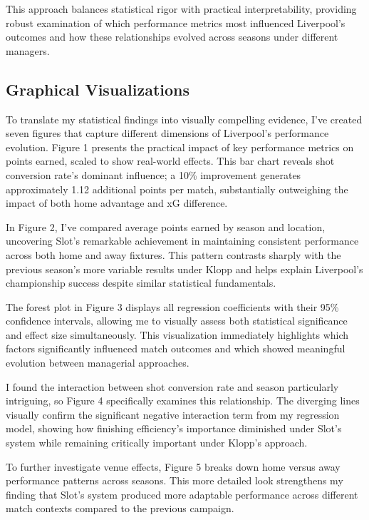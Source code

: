 \documentclass[12pt]{article}
\begin{document}
This approach balances statistical rigor with practical interpretability, providing robust examination of which performance metrics most influenced Liverpool's outcomes and how these relationships evolved across seasons under different managers.

\subsection*{Graphical Visualizations}

To translate my statistical findings into visually compelling evidence, I've created seven figures that capture different dimensions of Liverpool's performance evolution. Figure 1 presents the practical impact of key performance metrics on points earned, scaled to show real-world effects. This bar chart reveals shot conversion rate's dominant influence; a 10\% improvement generates approximately 1.12 additional points per match, substantially outweighing the impact of both home advantage and xG difference.

In Figure 2, I've compared average points earned by season and location, uncovering Slot's remarkable achievement in maintaining consistent performance across both home and away fixtures. This pattern contrasts sharply with the previous season's more variable results under Klopp and helps explain Liverpool's championship success despite similar statistical fundamentals.

The forest plot in Figure 3 displays all regression coefficients with their 95\% confidence intervals, allowing me to visually assess both statistical significance and effect size simultaneously. This visualization immediately highlights which factors significantly influenced match outcomes and which showed meaningful evolution between managerial approaches.

I found the interaction between shot conversion rate and season particularly intriguing, so Figure 4 specifically examines this relationship. The diverging lines visually confirm the significant negative interaction term from my regression model, showing how finishing efficiency's importance diminished under Slot's system while remaining critically important under Klopp's approach.

To further investigate venue effects, Figure 5 breaks down home versus away performance patterns across seasons. This more detailed look strengthens my finding that Slot's system produced more adaptable performance across different match contexts compared to the previous campaign.
\end{document}
